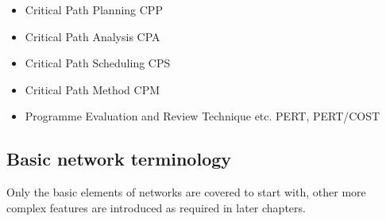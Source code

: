 \documentclass[]{report}
\begin{document}
\begin{itemize}
	\item Critical Path Planning CPP 
	\item Critical Path Analysis CPA 
	\item Critical Path Scheduling CPS 
	\item Critical Path Method CPM 
	\item Programme Evaluation and Review Technique etc. PERT, PERT/COST 
\end{itemize} 






\subsection*{Basic network terminology}
Only the basic elements of networks are covered to start with, other more complex features are introduced as required in later chapters. 
\end{document}
